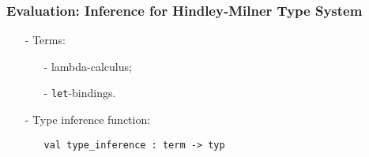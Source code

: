 \documentclass{beamer}
\theoremstyle{definition}
\begin{document}
\begin{comment}

\begin{frame}[fragile]\frametitle{Evaluation: Syntactic Unification}
\begin{tabular}{l}
\begin{lstlisting}
unify (=== Var "x") (=== (Cnst ("A", (=== [])))) [] q 
==> [q = Some [("x", Cnst ("A", []))]]
   
   
   
unify (=== q) (=== (Cnst ("A", []))) (=== []) 
      (Some [("z", (Cnst ("A", [])))])) 
==>  [q = Var "z"]     
\end{lstlisting}
\end{tabular}

\end{frame}


\begin{frame}[fragile]\frametitle{Evaluation: Syntactic Unification}

\begin{tabular}{l}
\begin{lstlisting}
unify (=== q) (=== r) (=== []) 
      (Some [("z", (Cnst ("A", [])))]) 
==> [(
      q = Var "x", 
      r = Cnst ("A", [])
    ); (
      q = Cnst ("A", []), 
      r = Var "x"
    ); (
      q = Cnst (_.2, [Var "x"]), 
      r = Cnst (_.2, [Cnst ("A", [])])
    );
    ...
]
\end{lstlisting}
\end{tabular}

\end{frame}
\end{comment}

\begin{frame}[fragile]\frametitle{Evaluation: Inference for Hindley-Milner Type System}
\begin{itemize}
    \item[-] Terms: 
    \begin{itemize}
        \item[-] lambda-calculus;
        \item[-] \lstinline{let}-bindings.
    \end{itemize}
    \vskip5mm
    \item[-] Type inference function:
        \vskip2mm
        \begin{itemize}
           \item[]\lstinline{val type_inference : term -> typ}
        \end{itemize}
\end{itemize}

\end{frame}
\end{document}
